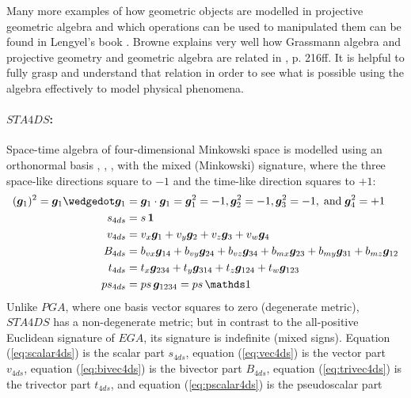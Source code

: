 Many more examples of how geometric objects are modelled in projective geometric algebra
and which operations can be used to manipulated them can be found in Lengyel's book
\cite{Lengyel_pga-illuminated:2024}. Browne explains very well how Grassmann algebra and
projective geometry and geometric algebra are related in
\cite{Browne_Grassmann-Algebra_Vol1:2012}, p. 216ff. It is helpful to fully grasp and
understand that relation in order to see what is possible using the algebra effectively to
model physical phenomena.

\paragraph{$STA4DS$:}
Space-time algebra of four-dimensional Minkowski space is modelled using an orthonormal
basis , , ,  with the mixed (Minkowski) signature, where the three
space-like directions square to $-1$ and the time-like direction  squares to $+1$:
\begin{subequations}
    \begin{align}
        (\gv{1})^2 = \gv{1} \wedgedot \gv1 & = \gv{1} \cdot \gv1 = \gv{1}^2 = -1,
        \gv{2}^2 = -1, \gv{3}^2 = -1, \;\text{and}\; \gv{4}^2 = +1 \nonumber\\
        s_{4ds} & = s \, \bm{1}
        \label{eq:scalar4ds} \\
        v_{4ds} & = v_x\gv{1} + v_y\gv{2} + v_z\gv{3} + v_w\gv{4}
        \label{eq:vec4ds} \\
        B_{4ds} & = b_{vx}\gv{14} + b_{vy}\gv{24} + b_{vz}\gv{34} +
                    b_{mx}\gv{23} + b_{my}\gv{31} + b_{mz}\gv{12}
        \label{eq:bivec4ds} \\
        t_{4ds} & = t_{x}\gv{234} + t_{y}\gv{314} + t_{z}\gv{124} + t_{w}\gv{123}
        \label{eq:trivec4ds} \\
        ps_{4ds} & = ps \, \gv{1234}  = ps \, \ps
        \label{eq:pscalar4ds}
    \end{align}
\end{subequations}
Unlike $PGA$, where one basis vector squares to zero (degenerate metric), $STA4DS$ has a
non-degenerate metric; but in contrast to the all-positive Euclidean signature of $EGA$,
its signature is indefinite (mixed signs). Equation (\ref{eq:scalar4ds}) is the scalar
part $s_{4ds}$, equation (\ref{eq:vec4ds}) is the vector part $v_{4ds}$, equation
(\ref{eq:bivec4ds}) is the bivector part $B_{4ds}$, equation (\ref{eq:trivec4ds}) is the
trivector part $t_{4ds}$, and equation (\ref{eq:pscalar4ds}) is the pseudoscalar part
